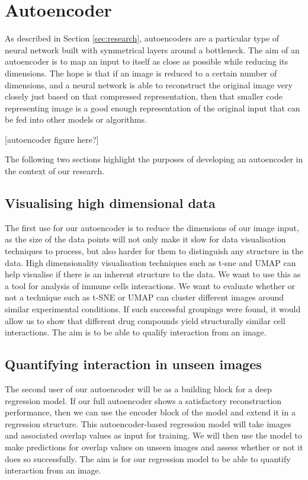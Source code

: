 \section{Autoencoder}

As described in Section \ref{sec:research}, autoencoders are a particular type of neural network built with symmetrical layers around a bottleneck. The aim of an autoencoder is to map an input to itself as close as possible while reducing its dimensions. The hope is that if an image is reduced to a certain number of dimensions, and a neural network is able to reconstruct the original image very closely just based on that compressed representation, then that smaller code representing image is a good enough representation of the original input that can be fed into other models or algorithms.

[autoencoder figure here?]

The following two sections highlight the purposes of developing an autoencoder in the context of our research.

\subsection{Visualising high dimensional data}

The first use for our autoencoder is to reduce the dimensions of our image input, as the size of the data points will not only make it slow for data visualisation techniques to process, but also harder for them to distinguish any structure in the data. High dimensionality visualisation techniques such as t-sne and UMAP can help visualise if there is an inherent structure to the data. We want to use this as a tool for analysis of immune cells interactions. We want to evaluate whether or not a technique such as t-SNE or UMAP can cluster different images around similar experimental conditions. If such successful groupings were found, it would allow us to show that different drug compounds yield structurally similar cell interactions. The aim is to be able to qualify interaction from an image.

\subsection{Quantifying interaction in unseen images}

The second user of our autoencoder will be as a building block for a deep regression model. If our full autoencoder shows a satisfactory reconstruction performance, then we can use the encoder block of the model and extend it in a regression structure. This autoencoder-based regression model will take images and associated overlap values as input for training. We will then use the model to make predictions for overlap values on unseen images and assess whether or not it does so successfully. The aim is for our regression model to be able to quantify interaction from an image.
